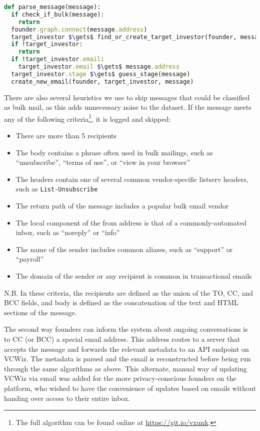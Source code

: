 \begin{minipage}{\linewidth}
\begin{lstlisting}[frame=single,mathescape=true,language=Ruby,basicstyle=\footnotesize,columns=fullflexible,caption={Parse Message},label={code:parse}]
def parse_message(message):
  if check_if_bulk(message):
    return
  founder.graph.connect(message.address)
  target_investor $\gets$ find_or_create_target_investor(founder, message)
  if !target_investor:
    return
  if !target_investor.email:
    target_investor.email $\gets$ message.address
  target_investor.stage $\gets$ guess_stage(message)
  create_new_email(founder, target_investor, message)
\end{lstlisting}
\end{minipage}

There are also several heuristics we use to skip messages that could be classified as bulk mail, as this adds unnecessary noise to the dataset. If the message meets any of the following criteria\footnote{The full algorithm can be found online at \url{https://git.io/vxunk}.}, it is logged and skipped:

\begin{itemize}
  \item There are more than 5 recipients
  \item The body contains a phrase often used in bulk mailings, such as ``unsubscribe'', ``terms of use'', or ``view in your browser''
  \item The headers contain one of several common vendor-specific listserv headers, such as \texttt{List-Unsubscribe}
  \item The return path of the message includes a popular bulk email vendor
  \item The local component of the from address is that of a commonly-automated inbox, such as ``noreply'' or ``info''
  \item The name of the sender includes common aliases, such as ``support'' or ``payroll''
  \item The domain of the sender or any recipient is common in transactional emails
\end{itemize}

N.B. In these criteria, the recipients are defined as the union of the TO, CC, and BCC fields, and body is defined as the concatenation of the text and HTML sections of the message.

The second way founders can inform the system about ongoing conversations is to CC (or BCC) a special email address. This address routes to a server that accepts the message and forwards the relevant metadata to an API endpoint on VCWiz. The metadata is parsed and the email is reconstructed before being run through the same algorithms as above. This alternate, manual way of updating VCWiz via email was added for the more privacy-conscious founders on the platform, who wished to have the convenience of updates based on emails without handing over access to their entire inbox.

